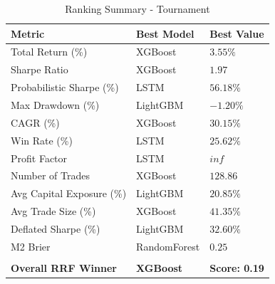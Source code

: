 \begin{table}[H]
\centering
\caption{{Ranking Summary - Tournament}}
\label{tab:ranking_tournament}
\small \begin{tabular}{lll}
\toprule
Metric & Best Model & Best Value \\
\midrule
Total Return (\%) & XGBoost & $3.55\%$ \\
Sharpe Ratio & XGBoost & $1.97$ \\
Probabilistic Sharpe (\%) & LSTM & $56.18\%$ \\
Max Drawdown (\%) & LightGBM & $-1.20\%$ \\
CAGR (\%) & XGBoost & $30.15\%$ \\
Win Rate (\%) & LSTM & $25.62\%$ \\
Profit Factor & LSTM & $inf$ \\
Number of Trades & XGBoost & $128.86$ \\
Avg Capital Exposure (\%) & LightGBM & $20.85\%$ \\
Avg Trade Size (\%) & XGBoost & $41.35\%$ \\
Deflated Sharpe (\%) & LightGBM & $32.60\%$ \\
M2 Brier & RandomForest & $0.25$ \\
\\ \midrule \textbf{Overall RRF Winner} & \textbf{XGBoost} & \textbf{Score: 0.19} \\\bottomrule
\end{tabular}
\end{table}
